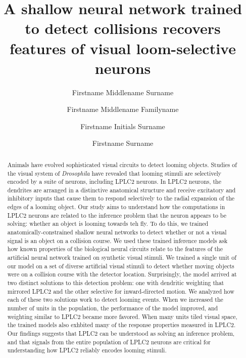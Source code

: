 \documentclass[pdftex,9pt,lineno]{elife}
\title{A shallow neural network trained to detect collisions recovers features of visual loom-selective neurons}
\author[1*]{Firstname Middlename Surname}
\author[1,2\authfn{1}\authfn{3}]{Firstname Middlename Familyname}
\author[2\authfn{1}\authfn{4}]{Firstname Initials Surname}
\author[2*]{Firstname Surname}
\affil[1]{Institution 1}
\affil[2]{Institution 2}
\begin{document}
\maketitle




\begin{abstract}
Animals have evolved sophisticated visual circuits to detect looming objects. Studies of the visual system of \textit{Drosophila} have revealed that looming stimuli are selectively encoded by a suite of neurons, including LPLC2 neurons. In LPLC2 neurons, the dendrites are arranged in a distinctive anatomical structure and receive excitatory and inhibitory inputs that cause them to respond selectively to the radial expansion of the edges of a looming object. Our study aims to understand how the computations in LPLC2 neurons are related to the inference problem that the neuron appears to be solving: whether an object is looming towards teh fly. To do this, we trained anatomically-constrained shallow neural networks to detect whether or not a visual signal is an object on a collision course. We used these trained inference models ask how known properties of the biological neural circuits relate to the features of the artificial neural network trained on synthetic visual stimuli. We trained a single unit of our model on a set of diverse artificial visual stimuli to detect whether moving objects were on a collision course with the detector location. Surprisingly, the model arrived at two distinct solutions to this detection problem: one with dendritic weighting that mirrored LPLC2 and the other selective for inward-directed motion. We analyzed how each of these two solutions work to detect looming events. When we increased the number of units in the population, the performance of the model improved, and weighting similar to LPLC2 became more favored. When many units tiled visual space, the trained models also exhbited many of the response properties measured in LPLC2. Our findings suggests that LPLC2 can be understood as solving an inference problem, and that signals from the entire population of LPLC2 neurons are critical for understanding how LPLC2 reliably encodes looming stimuli.
\end{abstract}
\end{document}
